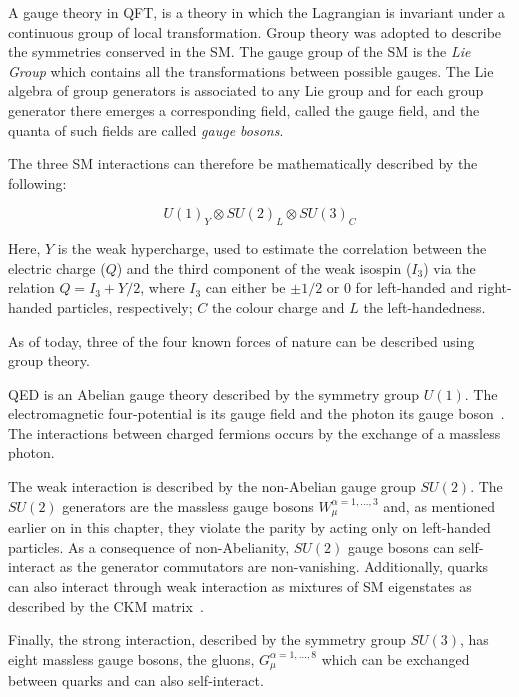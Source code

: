 			A gauge theory in QFT, is a theory in which the Lagrangian is invariant under a continuous group of local transformation. Group theory was adopted to describe the symmetries conserved in the SM. The gauge group of the SM is the \emph{Lie Group} which contains all the transformations between possible gauges. The Lie algebra of group generators is associated to any Lie group and for each group generator there emerges a corresponding field, called the gauge field, and the quanta of such fields are called \emph{gauge bosons}.
			
			The three SM interactions can therefore be mathematically described by the following:

			\begin{equation}
			\label{eq:SM_gaugeSym}
				U(1)_Y \otimes SU(2)_L \otimes SU(3)_C
			\end{equation}

			\noindent Here, $Y$ is the weak hypercharge, used to estimate the correlation between the electric charge ($Q$) and the third component of the weak isospin ($I_3$) via the relation $Q = I_3 + Y/2$, where $I_3$ can either be $\pm 1/2$ or $0$ for left-handed and right-handed particles, respectively; $C$ the colour charge and $L$ the left-handedness. 

			As of today, three of the four known forces of nature can be described using group theory. 

			QED is an Abelian gauge theory described by the symmetry group $U(1)$. The electromagnetic four-potential is its gauge field and the photon its gauge boson~\cite{Pich2012}. The interactions between charged fermions occurs by the exchange of a massless photon. 

			The weak interaction is described by the non-Abelian gauge group $SU(2)$. The $SU(2)$ generators are the massless gauge bosons $W_{\mu}^{\alpha = 1,\dots,3}$ and, as mentioned earlier on in this chapter, they violate the parity by acting only on left-handed particles. As a consequence of non-Abelianity, $SU(2)$ gauge bosons can self-interact as the generator commutators are non-vanishing. Additionally, quarks can also interact through weak interaction as mixtures of SM eigenstates as described by the CKM matrix~\cite{Olive2014}.

			Finally, the strong interaction, described by the symmetry group $SU(3)$, has eight massless gauge bosons, the gluons, $G_{\mu}^{\alpha=1,\dots,8}$ which can be exchanged between quarks and can also self-interact. 





